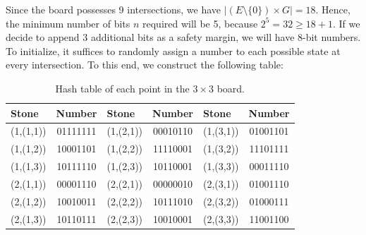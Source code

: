 Since the board possesses 9 intersections, we have \(|(E\setminus\{0\}) \times G| = 18\). Hence, the minimum number of bits \(n\) required will be 5, because \(2^5 = 32 \geq 18 + 1\). If we decide to append 3 additional bits as a safety margin, we will have 8-bit numbers. To initialize, it suffices to randomly assign a number to each possible state at every intersection. To this end, we construct the following table:
\begin{table}[H]
	\centering
	\small
	\begin{tabular}{lc|lc|lc}
		\textbf{Stone} & \textbf{Number} & \textbf{Stone} & \textbf{Number} & \textbf{Stone} & \textbf{Number} \\ \hline
		(1,(1,1)) & 01111111 & (1,(2,1)) & 00010110 & (1,(3,1)) & 01001101 \\
		(1,(1,2)) & 10001101 & (1,(2,2)) & 11110001 & (1,(3,2)) & 11101111 \\
		(1,(1,3)) & 10111110 & (1,(2,3)) & 10110001 & (1,(3,3)) & 00011110 \\
		(2,(1,1)) & 00001110 & (2,(2,1)) & 00000010 & (2,(3,1)) & 01001110 \\
		(2,(1,2)) & 10010011 & (2,(2,2)) & 10111010 & (2,(3,2)) & 01000111 \\
		(2,(1,3)) & 10110111 & (2,(2,3)) & 10010001 & (2,(3,3)) & 11001100 \\
	\end{tabular}
	\caption{Hash table of each point in the $3\times 3$ board.}
	\label{tablahash}
\end{table}

